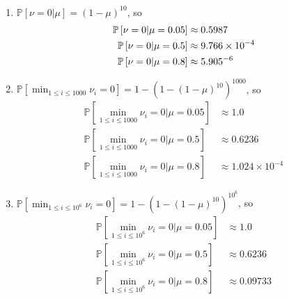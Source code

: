 \documentclass{amsart}
\begin{document}
\begin{solution}\ 
  \begin{enumerate}
    \item \(\mathbb{P}\left[\nu=0 | \mu\right] = (1-\mu)^{10}\), so
      \begin{align*}
        \mathbb{P}\left[\nu=0|\mu=0.05\right] &\approx 0.5987 \\
        \mathbb{P}\left[\nu=0|\mu=0.5\right] &\approx 9.766 \times 10^{-4} \\
        \mathbb{P}\left[\nu=0|\mu=0.8\right] &\approx 5.905 \time 10^{-6}
      \end{align*}
    \item \(\mathbb{P}\left[\min_{1\leq i\leq 1000} \nu_i = 0\right] = 1 -
      (1 - (1-\mu)^{10})^{1000}\), so
      \begin{align*}
        \mathbb{P}\left[\min_{1\leq i\leq 1000} \nu_i=0|\mu=0.05\right]
          &\approx 1.0 \\
        \mathbb{P}\left[\min_{1\leq i\leq 1000} \nu_i=0|\mu=0.5\right]
          &\approx 0.6236 \\
        \mathbb{P}\left[\min_{1\leq i\leq 1000} \nu_i=0|\mu=0.8\right]
          &\approx 1.024 \times 10^{-4}
      \end{align*}
    \item \(\mathbb{P}\left[\min_{1\leq i\leq 10^6} \nu_i = 0\right] = 1 -
      (1 - (1-\mu)^{10})^{10^6}\), so
      \begin{align*}
        \mathbb{P}\left[\min_{1\leq i\leq 10^6} \nu_i=0|\mu=0.05\right]
          &\approx 1.0 \\
        \mathbb{P}\left[\min_{1\leq i\leq 10^6} \nu_i=0|\mu=0.5\right]
          &\approx 0.6236 \\
        \mathbb{P}\left[\min_{1\leq i\leq 10^6} \nu_i=0|\mu=0.8\right]
          &\approx 0.09733
      \end{align*}
  \end{enumerate}
\end{solution}
\end{document}
